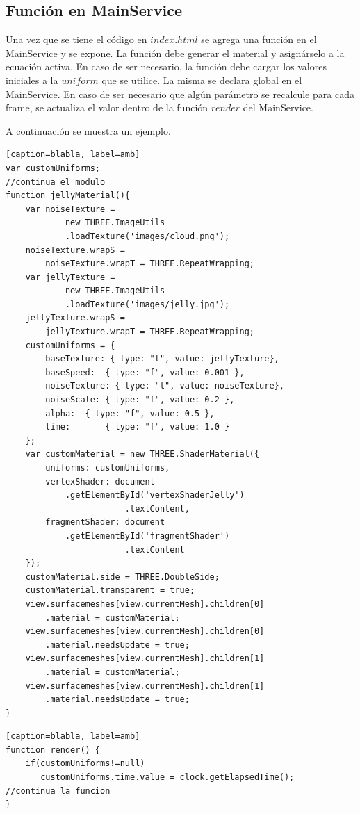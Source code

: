 \documentclass[12pt]{article}
\begin{document}
\subsection{Función en MainService}
Una vez que se tiene el código en $index.html$ se agrega una función en el MainService y se expone. La función debe generar el material y asignárselo a la ecuación activa. En caso de ser necesario, la función debe cargar los valores iniciales a la $uniform$ que se utilice. La misma se declara global en el MainService. En caso de ser necesario que algún parámetro se recalcule para cada frame, se actualiza el valor dentro de la función $render$ del MainService.

A continuación se muestra un ejemplo.
\clearpage
\begin{lstlisting}[frame=single][caption=blabla, label=amb]
var customUniforms;
//continua el modulo
function jellyMaterial(){
	var noiseTexture = 
    		new THREE.ImageUtils
			.loadTexture('images/cloud.png');
	noiseTexture.wrapS = 
		noiseTexture.wrapT = THREE.RepeatWrapping; 		
	var jellyTexture = 
    		new THREE.ImageUtils
			.loadTexture('images/jelly.jpg');
	jellyTexture.wrapS = 
		jellyTexture.wrapT = THREE.RepeatWrapping; 
	customUniforms = {
		baseTexture: { type: "t", value: jellyTexture},
		baseSpeed: 	{ type: "f", value: 0.001 },
		noiseTexture: { type: "t", value: noiseTexture},
		noiseScale:	{ type: "f", value: 0.2 },
		alpha: 	{ type: "f", value: 0.5 },
		time: 		{ type: "f", value: 1.0 }
	};
	var customMaterial = new THREE.ShaderMaterial({
	    uniforms: customUniforms,
		vertexShader: document
			.getElementById('vertexShaderJelly')
        				.textContent,
		fragmentShader: document
			.getElementById('fragmentShader')
        				.textContent
	});
	customMaterial.side = THREE.DoubleSide;
	customMaterial.transparent = true;
	view.surfacemeshes[view.currentMesh].children[0]
		.material = customMaterial;
	view.surfacemeshes[view.currentMesh].children[0]
		.material.needsUpdate = true;
	view.surfacemeshes[view.currentMesh].children[1]
		.material = customMaterial;
	view.surfacemeshes[view.currentMesh].children[1]
		.material.needsUpdate = true;
}
\end{lstlisting}
\clearpage
\begin{lstlisting}[frame=single][caption=blabla, label=amb]
function render() {
	if(customUniforms!=null)
	   customUniforms.time.value = clock.getElapsedTime();
//continua la funcion
}
\end{lstlisting}
\clearpage
\end{document}
